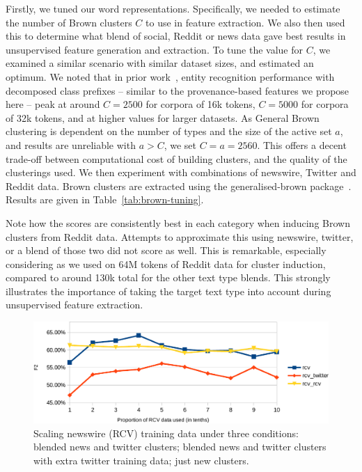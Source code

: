 \documentclass[journal,10pt,draftclsnofoot,onecolumn]{IEEEtran}
\begin{document}
Firstly, we tuned our word representations.
Specifically, we needed to estimate the number of Brown clusters $C$ to use in feature extraction.
We also then used this to determine what blend of social, Reddit or news data gave best results in unsupervised feature generation and extraction.
To tune the value for $C$, we examined a similar scenario with similar dataset sizes, and estimated an optimum.
We noted that in prior work~\cite{derczynski2015tune}, entity recognition performance with decomposed class prefixes -- similar to the provenance-based features we propose here -- peak at around $C=2500$ for corpora of 16k tokens, $C=5000$ for corpora of 32k tokens, and at higher values for larger datasets.
As General Brown clustering is dependent on the number of types and the size of the active set $a$, and results are unreliable with $a>C$, we set $C = a = 2560$.
This offers a decent trade-off between computational cost of building clusters, and the quality of the clusterings used.
We then experiment with combinations of newswire, Twitter and Reddit data.
Brown clusters are extracted using the generalised-brown package~\cite{sean_chester_2015_33758}.
Results are given in Table~\ref{tab:brown-tuning}.

Note how the scores are consistently best in each category when inducing Brown clusters from Reddit data.
Attempts to approximate this using newswire, twitter, or a blend of those two did not score as well.
This is remarkable, especially considering as we used on 64M tokens of Reddit data for cluster induction, compared to around 130k total for the other text type blends.
This strongly illustrates the importance of taking the target text type into account during unsupervised feature extraction.



\begin{figure}
\centering
\includegraphics{entity-chunking/chart-results-rcv-crop.pdf}
\caption{Scaling newswire (RCV) training data under three conditions: blended news and twitter clusters; blended news and twitter clusters with extra twitter training data; just new clusters.}
\label{fig:rcv-scaling}
\end{figure}
\end{document}
